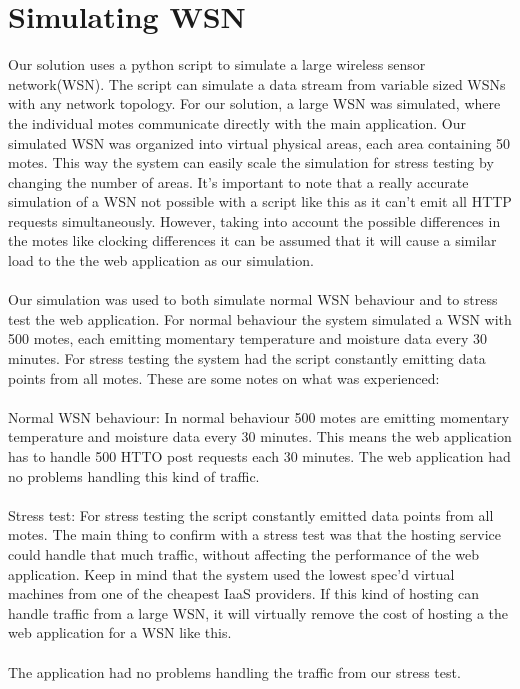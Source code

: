 \documentclass[]{uiophd}
\begin{document}
\section{Simulating WSN}
Our solution uses a python script to simulate a large wireless sensor network(WSN). The script can simulate a data stream from variable sized WSNs with any network topology. For our solution, a large WSN was simulated, where the individual motes communicate directly with the main application. Our simulated WSN was organized into virtual physical areas, each area containing 50 motes. This way the system can easily scale the simulation for stress testing by changing the number of areas. It’s important to note that a really accurate simulation of a WSN not possible with a script like this as it can’t emit all HTTP requests simultaneously. However, taking into account the possible differences in the motes like clocking differences it can be assumed that it will cause a similar load to the the web application as our simulation.
\\\\
Our simulation was used to both simulate normal WSN behaviour and to stress test the web application. For normal behaviour the system simulated a WSN with 500 motes, each emitting momentary temperature and moisture data every 30 minutes. For stress testing the system had the script constantly emitting data points from all motes. These are some notes on what was experienced:
\\\\
Normal WSN behaviour: In normal behaviour 500 motes are emitting momentary temperature and moisture data every 30 minutes. This means the web application has to handle 500 HTTO post requests each 30 minutes. The web application had no problems handling this kind of traffic.
\\\\
Stress test:  For stress testing the script constantly emitted data points from all motes. The main thing to confirm with a stress test was that the hosting service could handle that much traffic, without affecting the performance of the web application. Keep in mind that the system used the lowest spec’d virtual machines from one of the cheapest IaaS providers. If this kind of hosting can handle traffic from a large WSN, it will virtually remove the cost of hosting a the web application for a WSN like this. 
\\\\
The application had no problems handling the traffic from our stress test.
\end{document}
